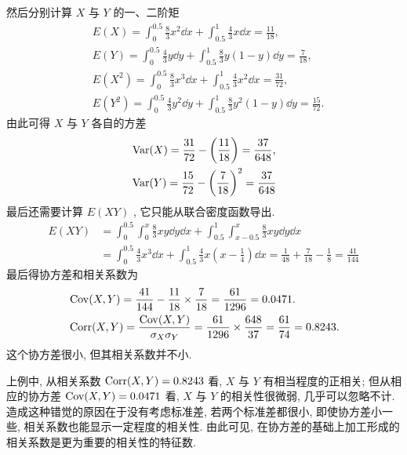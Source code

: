 \begin{example}
\begin{solution}
\begin{equation*}
			\end{equation*}
			然后分别计算 $X$ 与 $Y$ 的一、二阶矩
			\begin{align*}
				&E(X)=\int_{0}^{0.5} \frac{8}{3} x^{2} \dd x+\int_{0.5}^{1} \frac{4}{3} x \dd x=\frac{11}{18},\\
				&E(Y)=\int_{0}^{0.5} \frac{4}{3} y \dd y+\int_{0.5}^{1} \frac{8}{3} y(1-y) \dd y=\frac{7}{18},\\
				&E\left(X^{2}\right)=\int_{0}^{0.5} \frac{8}{3} x^{3} \dd x+\int_{0.5}^{1} \frac{4}{3} x^{2} \dd x=\frac{31}{72},\\
				&E\left(Y^{2}\right)=\int_{0}^{0.5} \frac{4}{3} y^{2} \dd y+\int_{0.5}^{1} \frac{8}{3} y^{2}(1-y) \dd y=\frac{15}{72}.
			\end{align*}
			由此可得 $X$ 与 $Y$ 各自的方差
			\begin{align*}
				&\operatorname{Var}(X)=\frac{31}{72}-\left(\frac{11}{18}\right)=\frac{37}{648},\\
				&\operatorname{Var}(Y)=\frac{15}{72}-\left(\frac{7}{18}\right)^{2}=\frac{37}{648}
			\end{align*}
			最后还需要计算 $E(XY)$ , 它只能从联合密度函数导出.
			\begin{align*}
				E(XY)&=\int_{0}^{0.5} \int_{0}^{x} \frac{8}{3} x y \dd y \dd x+\int_{0.5}^{1} \int_{x-0.5}^{x} \frac{8}{3} x y \dd y \dd x\\
				&=\int_{0}^{0.5} \frac{4}{3} x^{3} \dd x+\int_{0.5}^{1} \frac{4}{3} x\left(x-\frac{1}{4}\right) \dd x=\frac{1}{48}+\frac{7}{18}-\frac{1}{8}=\frac{41}{144}
			\end{align*}
			最后得协方差和相关系数为
			\begin{align*}
				&\operatorname{Cov}(X,Y)=\frac{41}{144}-\frac{11}{18} \times \frac{7}{18}=\frac{61}{1296}=0.0471.\\
				&\operatorname{Corr}(X,Y)=\frac{\operatorname{Cov}(X,Y)}{\sigma_{X}\sigma_{Y}}=\frac{61}{1296} \times \frac{648}{37}=\frac{61}{74}=0.8243.
			\end{align*}
			这个协方差很小, 但其相关系数并不小.
		\end{solution}
	\end{example}
	上例中, 从相关系数 $\operatorname{Corr}(X,Y)=0.8243$ 看, $X$ 与 $Y$ 有相当程度的正相关; 但从相应的协方差 $\operatorname{Cov}(X,Y)=0.0471$ 看, $X$ 与 $Y$ 的相关性很微弱, 几乎可以忽略不计. 造成这种错觉的原因在于没有考虑标准差, 若两个标准差都很小, 即使协方差小一些, 相关系数也能显示一定程度的相关性. 由此可见, 在协方差的基础上加工形成的相关系数是更为重要的相关性的特征数.

